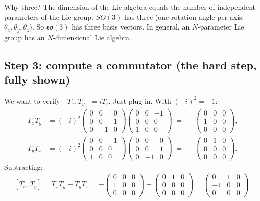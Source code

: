 \documentclass[11pt]{article}
\begin{document}
\begin{intuitionbox}{Why three?}
The dimension of the Lie algebra equals the number of independent
parameters of the Lie group. $SO(3)$ has three (one rotation angle per
axis: $\theta_x, \theta_y, \theta_z$). So $\mathfrak{so}(3)$ has three
basis vectors. In general, an $N$-parameter Lie group has an
$N$-dimensional Lie algebra.
\end{intuitionbox}

\subsection*{Step 3: compute a commutator (the hard step, fully shown)}

We want to verify $[T_x, T_y] = i T_z$. Just plug in. With
$(-i)^2 = -1$:
\begin{align*}
  T_x T_y &= (-i)^2
    \begin{pmatrix} 0 & 0 & 0 \\ 0 & 0 & 1 \\ 0 & -1 & 0 \end{pmatrix}
    \begin{pmatrix} 0 & 0 & -1 \\ 0 & 0 & 0 \\ 1 & 0 & 0 \end{pmatrix}
    \;=\; -\begin{pmatrix} 0 & 0 & 0 \\ 1 & 0 & 0 \\ 0 & 0 & 0 \end{pmatrix},
\\[4pt]
  T_y T_x &= (-i)^2
    \begin{pmatrix} 0 & 0 & -1 \\ 0 & 0 & 0 \\ 1 & 0 & 0 \end{pmatrix}
    \begin{pmatrix} 0 & 0 & 0 \\ 0 & 0 & 1 \\ 0 & -1 & 0 \end{pmatrix}
    \;=\; -\begin{pmatrix} 0 & 1 & 0 \\ 0 & 0 & 0 \\ 0 & 0 & 0 \end{pmatrix}.
\end{align*}
Subtracting:
\[
  [T_x, T_y] = T_x T_y - T_y T_x
  = -\begin{pmatrix} 0 & 0 & 0 \\ 1 & 0 & 0 \\ 0 & 0 & 0 \end{pmatrix}
    +\begin{pmatrix} 0 & 1 & 0 \\ 0 & 0 & 0 \\ 0 & 0 & 0 \end{pmatrix}
  = \begin{pmatrix} 0 & 1 & 0 \\ -1 & 0 & 0 \\ 0 & 0 & 0 \end{pmatrix}.
\]
\end{document}
